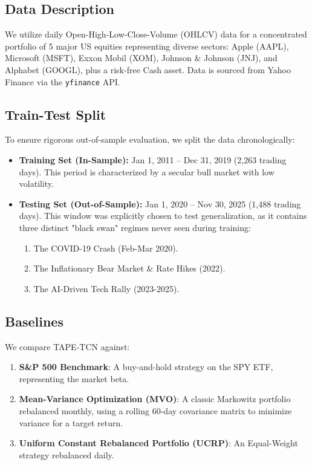 \subsection{Data Description}
We utilize daily Open-High-Low-Close-Volume (OHLCV) data for a concentrated portfolio of 5 major US equities representing diverse sectors: Apple (AAPL), Microsoft (MSFT), Exxon Mobil (XOM), Johnson \& Johnson (JNJ), and Alphabet (GOOGL), plus a risk-free Cash asset.
Data is sourced from Yahoo Finance via the \texttt{yfinance} API.

\subsection{Train-Test Split}
To ensure rigorous out-of-sample evaluation, we split the data chronologically:
\begin{itemize}
    \item \textbf{Training Set (In-Sample):} Jan 1, 2011 -- Dec 31, 2019 (2,263 trading days). This period is characterized by a secular bull market with low volatility.
    \item \textbf{Testing Set (Out-of-Sample):} Jan 1, 2020 -- Nov 30, 2025 (1,488 trading days). This window was explicitly chosen to test generalization, as it contains three distinct "black swan" regimes never seen during training:
    \begin{enumerate}
        \item The COVID-19 Crash (Feb-Mar 2020).
        \item The Inflationary Bear Market \& Rate Hikes (2022).
        \item The AI-Driven Tech Rally (2023-2025).
    \end{enumerate}
\end{itemize}

\subsection{Baselines}
We compare TAPE-TCN against:
\begin{enumerate}
    \item \textbf{S\&P 500 Benchmark}: A buy-and-hold strategy on the SPY ETF, representing the market beta.
    \item \textbf{Mean-Variance Optimization (MVO)}: A classic Markowitz portfolio rebalanced monthly, using a rolling 60-day covariance matrix to minimize variance for a target return.
    \item \textbf{Uniform Constant Rebalanced Portfolio (UCRP)}: An Equal-Weight strategy rebalanced daily.
\end{enumerate}


